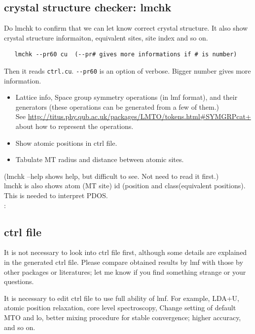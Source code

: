 \subsection{crystal structure checker: lmchk}
Do lmchk to confirm that we can let  know correct crystal
structure. It also show crystal structure informaiton, equivalent sites,
site index and so on.
\begin{verbatim}
   lmchk --pr60 cu  (--pr# gives more informations if # is number)
\end{verbatim}
Then it reads \verb+ctrl.cu+. \verb+--pr60+ is an option of verbose. Bigger number gives more information.
\begin{itemize}
\item Lattice info, Space group symmetry operations (in lmf format), and
      their generators (these operations can be generated from a few of them.)\\
      See \url{http://titus.phy.qub.ac.uk/packages/LMTO/tokens.html#SYMGRPcat+}
      about how to represent the operations.
\item Show atomic positions in ctrl file. 
\item Tabulate MT radius and distance between atomic sites.
\end{itemize}
(lmchk --help shows help, but difficult to see. Not need to read it first.)\\

lmchk is also shows atom (MT site) id (position and class(equivalent
positions). This is needed to interpret PDOS.\\

:

\subsection{ctrl file}
It is not necessary to look into ctrl file first, 
although some details are explained in the generated ctrl file.
Please compare obtained results by lmf with those by other packages or literatures; 
let me know if you find something strange or your questions.

It is necessary to edit ctrl file to use full ability of lmf.
For example, LDA+U, atomic position relaxation, core level
spectroscopy, Change setting of default MTO and lo,
better mixing procedure for stable convergence; higher accuracy, and so on. 

